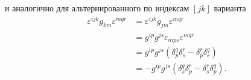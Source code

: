     и аналогично для альтернированного по индексам $[jk]$ варианта
    \begin{equation}\begin{aligned}
        \varepsilon^{ijk} g_{km} \varepsilon^{mqr}
            &= \varepsilon^{ijk} g_{jm} \varepsilon^{mqr} \\
            &= g^{ip} g^{js} \varepsilon_{mps} \varepsilon^{mqr} \\
            &= g^{ip} g^{js} \left(
                \delta_p^q \delta_s^r - \delta_p^r \delta_s^q
            \right) \\
            &= - g^{ip} g^{js} \left(
                \delta_s^q \delta_p^r - \delta_s^r \delta_p^q
            \right).
    \end{aligned}\end{equation}

